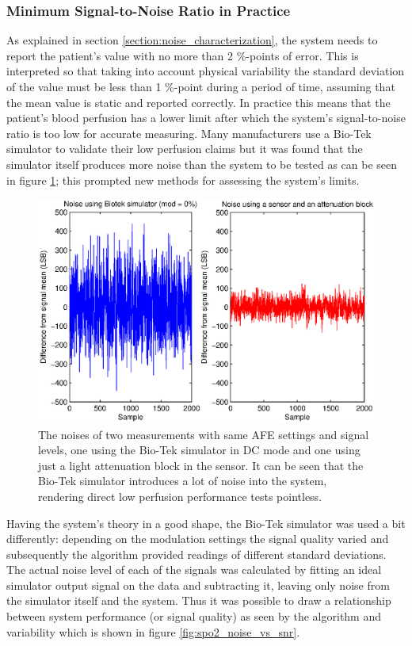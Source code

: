 \subsubsection{Minimum Signal-to-Noise Ratio in Practice}

As explained in section \ref{section:noise_characterization}, the system needs to report the patient's \spo value with no more than 2 \%-points of error. This is interpreted so that taking into account physical variability the standard deviation of the \spo value must be less than 1 \%-point during a period of time, assuming that the mean value is static and reported correctly. In practice this means that the patient's blood perfusion has a lower limit after which the system's signal-to-noise ratio is too low for accurate measuring. Many manufacturers use a Bio-Tek \spo simulator \cite{Bio-Tek} to validate their low perfusion claims but it was found that the simulator itself produces more noise than the system to be tested as can be seen in figure \ref{fig:biotek_DC_noise}; this prompted new methods for assessing the system's limits.

\begin{figure}[htcb]
  \includegraphics[scale=0.9]{kuvat/measurements/biotek_DC_noise.eps}
  \caption{The noises of two measurements with same AFE settings and signal levels, one using the Bio-Tek simulator in DC mode and one using just a light attenuation block in the sensor. It can be seen that the Bio-Tek simulator introduces a lot of noise into the system, rendering direct low perfusion performance tests pointless.}
  \label{fig:biotek_DC_noise}
\end{figure}

Having the system's theory in a good shape, the Bio-Tek simulator was used a bit differently: depending on the modulation settings the signal quality varied and subsequently the \spo algorithm provided readings of different standard deviations. The actual noise level of each of the signals was calculated by fitting an ideal simulator output signal on the data and subtracting it, leaving only noise from the simulator itself and the system. Thus it was possible to draw a relationship between system performance (or signal quality) as seen by the algorithm and \spo variability which is shown in figure \ref{fig:spo2_noise_vs_snr}. 


